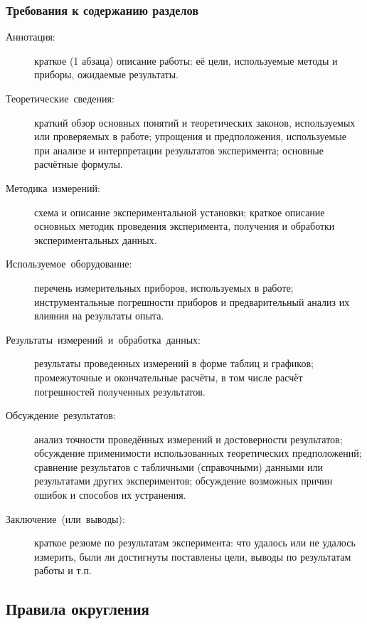 \subsubsection*{Требования к содержанию разделов}
\begin{description}
\item [{Аннотация:}] краткое (1 абзаца) описание работы: её
цели, используемые методы и приборы, ожидаемые результаты.
\item [{Теоретические~сведения:}] краткий обзор основных понятий и теоретических
законов, используемых или проверяемых в работе; упрощения и предположения,
используемые при анализе и интерпретации результатов эксперимента;
основные расчётные формулы.
\item [{Методика~измерений:}] схема и описание экспериментальной установки;
краткое описание основных методик проведения эксперимента, получения
и обработки экспериментальных данных.
\item [{Используемое~оборудование:}] перечень измерительных приборов,
используемых в работе; инструментальные погрешности приборов и предварительный
анализ их влияния на результаты опыта.
\item [{Результаты~измерений~и~обработка~данных:}] результаты проведенных
измерений в форме таблиц и графиков; промежуточные и окончательные
расчёты, в том числе расчёт погрешностей полученных результатов.
\item [{Обсуждение~результатов:}] анализ точности проведённых измерений
и достоверности результатов; обсуждение применимости использованных
теоретических предположений; сравнение результатов с табличными (справочными)
данными или результатами других экспериментов; обсуждение возможных
причин ошибок и способов их устранения.
\item [{Заключение~(или~выводы):}] краткое резюме по результатам эксперимента:
что удалось или не удалось измерить, были ли достигнуты поставлены
цели, выводы по результатам работы и т.п.
\end{description}

\subsection{Правила округления\label{subsec:round}}


